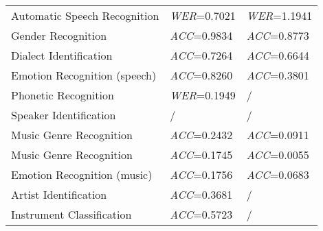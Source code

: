 \begin{longtable}[hbtp]{p{4.6cm}<{\raggedright}p{4.5cm}<{\raggedright}p{4.5cm}<{\raggedright}}
    Automatic Speech Recognition & \textit{WER}=0.7021 & \textit{WER}=1.1941 \\
    Gender Recognition & \textit{ACC}=0.9834 & \textit{ACC}=0.8773\\
    Dialect Identification & \textit{ACC}=0.7264 & \textit{ACC}=0.6644\\
    Emotion Recognition (speech) & \textit{ACC}=0.8260 & \textit{ACC}=0.3801\\
    Phonetic Recognition & \textit{WER}=0.1949 & /\\
    Speaker Identification & / & / \\
    \midrule
    Music Genre Recognition & \textit{ACC}=0.2432 & \textit{ACC}=0.0911\\
    Music Genre Recognition & \textit{ACC}=0.1745 & \textit{ACC}=0.0055\\ %
    Emotion Recognition (music) & \textit{ACC}=0.1756 & \textit{ACC}=0.0683\\
    Artist Identification & \textit{ACC}=0.3681 & /\\
    
    Instrument Classification & \textit{ACC}=0.5723 & / \\ %
    

\end{longtable}
